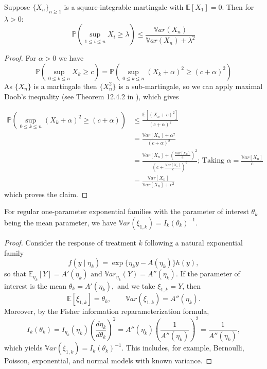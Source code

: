 \begin{lemma}\label{lem:chebychev-mart}
	Suppose  \(\{X_n\}_{n \geq 1}\) is a square-integrable martingale with \(\mathbb{E}[X_1]=0\). Then for \(\lambda > 0\):
	\[
	\mathbb{P}\left(\sup_{1\leq i \leq n} X_i \geq \lambda\right)\leq \frac{\mathbb{V}ar(X_n)}{\mathbb{V}ar(X_n)+ \lambda^2}
	\]
\end{lemma}
\begin{proof}
	For \(\alpha > 0\) we have
	\[
	\mathbb{P}\left(\sup_{0 \leq k \leq n} X_k \geq c \right) = \mathbb{P}\left(\sup_{0 \leq k \leq n} (X_k + \alpha)^2 \geq (c+\alpha)^2 \right)
	\]
	As \(\{X_n\}\) is a martingale then \(\{X_n^2\}\) is a sub-martingale, so we can apply maximal Doob's inequality (see Theorem 12.4.2 in \cite{jf-le-gall}), which gives
	
	\begin{align*}
		\mathbb{P}\left(\sup_{0 \leq k \leq n} (X_k + \alpha)^2 \geq (c + \alpha) \right) &\leq \frac{\mathbb{E}\left[(X_n + c)^2\right]}{(c + \alpha)^2}\\
		&= \frac{\mathbb{V}ar\left[X_n\right] + \alpha^2}{(c + \alpha)^2}\\
		&= \frac{\mathbb{V}ar\left[X_n\right] + \left(\frac{\mathbb{V}ar\left[X_n\right]}{c}\right)^2}{\left(c + \frac{\mathbb{V}ar\left[X_n\right]}{c}\right)^2} \text{; Taking \(\alpha = \frac{\mathbb{V}ar\left[X_n\right]}{c}\)}\\
		&= \frac{\mathbb{V}ar\left[X_n\right]}{\mathbb{V}ar\left[X_n\right] + c^2}
	\end{align*}
	which proves the claim.		
\end{proof}

\begin{proposition}\label{prop:exp-fam}
	For regular one-parameter exponential families with the parameter of interest $\theta_k$ being the mean parameter, we have $\mathbb{V}ar(\xi_{1,k}) = I_k(\theta_k)^{-1}$.
\end{proposition}
\begin{proof}
	Consider the response of treatment $k$ following a natural exponential family
	\[
	f(y \mid \eta_k)
	=
	\exp\{\eta_k y - A(\eta_k)\} h(y),
	\]
	so that \(\mathbb{E}_{\eta_k}[Y] = A'(\eta_k) \text{ and }
	\mathbb{V}ar_{\eta_k}(Y) = A''(\eta_k).\) If the parameter of interest is the mean \(\theta_k = A'(\eta_k),\)
	and we take $\xi_{1,k}=Y$, then
	\[
	\mathbb{E}[\xi_{1,k}] = \theta_k,
	\qquad
	\mathbb{V}ar(\xi_{1,k}) = A''(\eta_k).
	\]
	Moreover, by the Fisher information reparameterization formula,
	\[
	I_k(\theta_k)
	=
	I_{\eta_k}(\eta_k)
	\left(\frac{d\eta_k}{d\theta_k}\right)^2
	=
	A''(\eta_k)\left(\frac{1}{A''(\eta_k)}\right)^2
	=
	\frac{1}{A''(\eta_k)},
	\]
	which yields \(\mathbb{V}ar(\xi_{1,k}) = I_k(\theta_k)^{-1}.\)
	This includes, for example, Bernoulli, Poisson, exponential, and normal models with known variance.
\end{proof}

